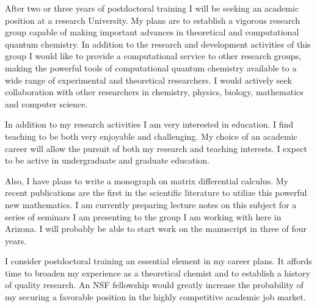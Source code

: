 \documentclass[12pt,thmsa]{article}
\begin{document}
After two or three years of postdoctoral training I will be seeking an
academic position at a research University. My plans are to establish a
vigorous research group capable of making important advances in theoretical
and computational quantum chemistry. In addition to the research and
development activities of this group I would like to provide a computational
service to other research groups, making the powerful tools of computational
quantum chemistry available to a wide range of experimental and theoretical
researchers. I would actively seek collaboration with other researchers in
chemistry, physics, biology, mathematics and computer science.

In addition to my research activities I am very interested in education. I
find teaching to be both very enjoyable and challenging. My choice of an
academic career will allow the pursuit of  both my research and teaching
interests. I expect to be active in undergraduate and graduate education.

Also, I have plans to write a monograph on matrix differential calculus. My
recent publications are the first in the scientific literature to utilize
this powerful new mathematics. I am currently preparing lecture notes on
this subject for a series of seminars I am presenting to the group I am
working with here in Arizona. I will probably be able to start work on the
manuscript in three of four years.

I consider postdoctoral training an essential element in my career plans. It
affords time to broaden my experience as a theoretical chemist and to
establish a history of quality research. An NSF fellowship would greatly
increase the probability of my securing a favorable position in the highly
competitive academic job market.
\end{document}
